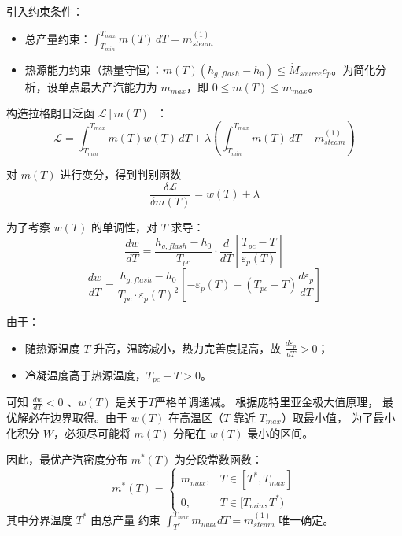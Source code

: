 \documentclass{thuemp}
\begin{document}
引入约束条件：
\begin{itemize}
    \item 总产量约束：$\int_{T_{min}}^{T_{max}} m(T) \, dT = m_{steam}^{(1)}$
    \item 热源能力约束（热量守恒）：$m(T)(h_{g,flash} - h_0) \le \dot{M}_{source}c_p$。为简化分析，设单点最大产汽能力为 $m_{max}$，即 $0 \le m(T) \le m_{max}$。
\end{itemize}
构造拉格朗日泛函 $\mathcal{L}[m(T)]$：
\begin{equation}
\mathcal{L}= \int_{T_{min}}^{T_{max}} m(T) w(T) \, dT + \lambda \left( \int_{T_{min}}^{T_{max}} m(T) \, dT - m_{steam}^{(1)} \right)
\end{equation}

对 $m(T)$ 进行变分，得到判别函数
\begin{equation}
\frac{\delta \mathcal{L}}{\delta m(T)} = w(T) + \lambda
\end{equation}

为了考察 $w(T)$ 的单调性，对 $T$ 求导：
\begin{equation}
\frac{dw}{dT} = \frac{h_{g,flash} - h_0}{T_{pc}} \cdot \frac{d}{dT} \left[ \frac{T_{pc} - T}{\varepsilon_p(T)} \right]
\end{equation}
\begin{equation}
\frac{dw}{dT} = \frac{h_{g,flash} - h_0}{T_{pc} \cdot \varepsilon_p(T)^2} \left[ -\varepsilon_p(T) - (T_{pc} - T) \frac{d\varepsilon_p}{dT} \right]
\end{equation}

由于：
\begin{itemize}
    \item 随热源温度 $T$ 升高，温跨减小，热力完善度提高，故 $\frac{d\varepsilon_p}{dT} > 0$；
    \item 冷凝温度高于热源温度，$T_{pc} - T > 0$。
\end{itemize}
可知 $\frac{dw}{dT} < 0$ 、$w(T)$ 是关于$T$严格单调递减。
根据庞特里亚金极大值原理，
最优解必在边界取得。由于 $w(T)$ 在高温区（$T$ 靠近 $T_{max}$）取最小值，
为了最小化积分 $W$，必须尽可能将 $m(T)$ 分配在 $w(T)$ 最小的区间。

因此，最优产汽密度分布 $m^*(T)$ 为分段常数函数：
\begin{equation}
m^*(T) = 
\begin{cases} 
m_{max}, & T \in [T^*, T_{max}] \\
0, & T \in [T_{min}, T^*) 
\end{cases}
\end{equation}
其中分界温度 $T^*$ 由总产量
约束 $\int_{T^*}^{T_{max}} m_{max} dT = m_{steam}^{(1)}$ 唯一确定。







\renewcommand\refname{\heiti\wuhao\centerline{参考文献}\global\def\refname{参考文献}}
\vskip 12pt

\let\OLDthebibliography\thebibliography
\renewcommand\thebibliography[1]{
  \OLDthebibliography{#1}
  \setlength{\parskip}{0pt}
  \setlength{\itemsep}{2pt}
}
{
\renewcommand{\baselinestretch}{1.2}
\liuhao


}
\end{document}

